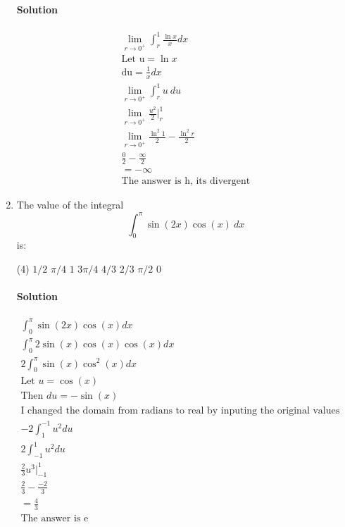 \documentclass[MATH-115-Notes.tex]{subfiles}
\begin{document}
\begin{enumerate}[itemsep=5mm]
    \paragraph*{Solution}
    \begin{gather*}
        \lim_{r \to 0^+}\int_{r}^{1}\frac{\ln x}{x}dx\\ 
        \text{Let u} = \ln x\\
        \text{du} = \frac{1}{x}dx\\
        \lim_{r \to 0^+} \int_{r}^{1}u\ du\\
        \lim_{r \to 0^+} \frac{u^2}{2}\Big|_r^1\\
        \lim_{r \to 0^+} \frac{\ln^2 1}{2} - \frac{\ln^2 r}{2}\\
        \frac{0}{2}-\frac{\infty}{2}\\
        = -\infty\\
        \text{The answer is h, its divergent}
    \end{gather*}
    
    \item The value of the integral \[\int_{0}^{\pi}\sin(2x)\cos(x)\ dx\] is:
    \begin{tasks}(4)
        \task \(1/2\)
        \task \(\pi/4\)
        \task \(1\)
        \task \(3\pi/4\)
        \task \(4/3\)
        \task \(2/3\)
        \task \(\pi/2\)
        \task \(0\)
    \end{tasks}
    \paragraph*{Solution}
    \begin{gather*}
        \int_{0}^{\pi}\sin(2x)\cos(x)dx\\
        \int_{0}^{\pi}2\sin(x)\cos(x)\cos(x)dx\\
        2\int_{0}^{\pi}\sin(x)\cos^2(x)dx\\
        \text{Let } u = \cos(x)\\
        \text{Then } du = -\sin(x)\\
        \text{I changed the domain from radians to real by inputing the original values into cos(x) to get 1 and -1.}\\
        -2\int_{1}^{-1}u^2du\\
        2\int_{-1}^{1}u^2du\\
        \frac{2}{3}u^3\Big|_{-1}^1\\
        \frac{2}{3}-\frac{-2}{3}\\
        = \frac{4}{3}\\
        \text{The answer is e}
    \end{gather*}
    \newpage


\end{enumerate}
\end{document}
